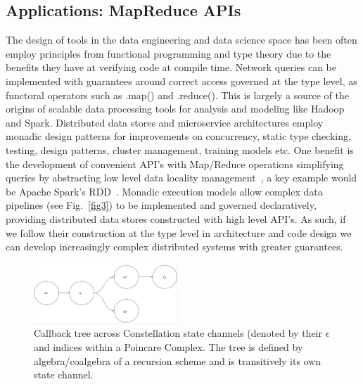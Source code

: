 \documentclass[runningheads]{llncs}
\begin{document}
\subsection{Applications: MapReduce APIs}
The design of tools in the data engineering and data science space has been often employ principles from functional programming and type theory due to the benefits they have at verifying code at compile time. Network queries can be implemented with guarantees around correct access governed at the type level, as functoral operators such as .map() and .reduce(). This is largely a source of the origins of scalable data processing tools for analysis and modeling like Hadoop and Spark. Distributed data stores and microservice architectures employ monadic design patterns for improvements on concurrency, static type checking, testing, design patterns, cluster management, training models etc. One benefit is the development of convenient API's with Map/Reduce operations simplifying queries by abstracting low level data locality management~\cite{ref_book2}, a key example would be Apache Spark's RDD~\cite{ref_url1}. Monadic execution models allow complex data pipelines (see Fig.~\ref{fig3}) to be implemented and governed declaratively, providing distributed data stores constructed with high level API's. As such, if we follow their construction at the type level in architecture and code design we can develop increasingly complex distributed systems with greater guarantees.
\begin{figure}
\centering
\includegraphics[height=2.25cm,width=0.6\columnwidth]{rec_tree_wide.png}
\caption{Callback tree across Constellation state channels (denoted by their $\epsilon$ and indices within a Poincare Complex. The tree is defined by algebra/coalgebra of a recursion scheme and is transitively its own state channel.} \label{fig4}
\end{figure}
\end{document}
